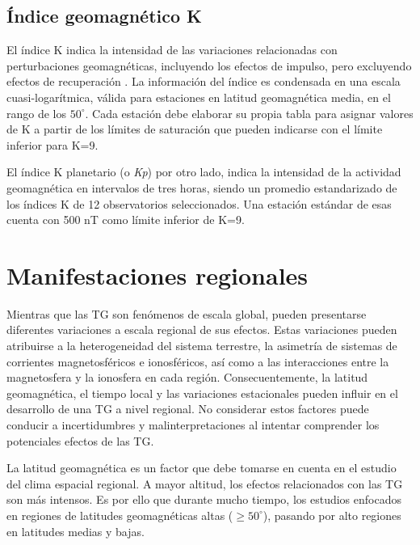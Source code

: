 \subsection{Índice geomagnético K}

El índice K indica la intensidad de las variaciones relacionadas con perturbaciones geomagnéticas, incluyendo los efectos de impulso, pero excluyendo efectos de recuperación \cite{BARTELS_kp}. La información del índice es condensada en una escala cuasi-logarítmica, válida para estaciones en latitud geomagnética media, en el rango de los $50^\circ$. Cada estación debe elaborar su propia tabla para asignar valores de K a partir de los límites de saturación que pueden indicarse con el límite inferior para K=9. 
\vspace{1 em}

El índice K planetario (o \emph{Kp}) por otro lado, indica la intensidad de la actividad geomagnética en intervalos de tres horas, siendo un promedio estandarizado de los índices K de 12 observatorios seleccionados. Una estación estándar de esas cuenta con 500 nT como límite inferior de K=9.

\section{Manifestaciones regionales}

Mientras que las TG son fenómenos de escala global, pueden presentarse diferentes variaciones a escala regional de sus efectos. Estas variaciones pueden atribuirse a la heterogeneidad del sistema terrestre, la asimetría de sistemas de corrientes magnetosféricos e ionosféricos, así como a las interacciones entre la magnetosfera y la ionosfera en cada región. Consecuentemente, la latitud geomagnética, el tiempo local y las variaciones estacionales pueden influir en el desarrollo de una TG a nivel regional. No considerar estos factores puede conducir a incertidumbres y malinterpretaciones al intentar comprender los potenciales efectos de las TG\cite{gic_intro, gic, gic_2, gic_brazil}.  
\vspace{1 em}

La latitud geomagnética es un factor que debe tomarse en cuenta en el estudio del clima espacial regional. A mayor altitud, los efectos relacionados con las TG son más intensos. Es por ello que durante mucho tiempo, los estudios enfocados en regiones de latitudes geomagnéticas altas ($\ge 50^{\circ}$), pasando por alto regiones en latitudes medias y bajas.
\vspace{1 em}

